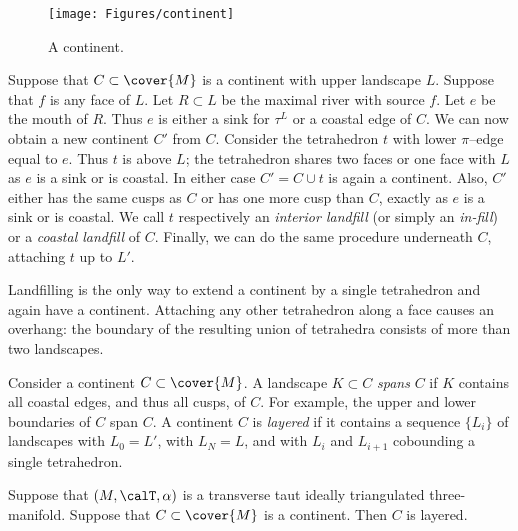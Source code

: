 \documentclass[12pt]{amsart}
\begin{document}
\begin{figure}[htb]
\centering
\texttt{[image: Figures/continent]}
\caption{A continent.}
\label{Fig:Continent}
\end{figure}

Suppose that $C \subset \cover{M}$ is a continent with upper landscape $L$.  Suppose that $f$ is any face of $L$.  Let $R \subset L$ be the maximal river with source $f$.  Let $e$ be the mouth of $R$.  Thus $e$ is either a sink for $\tau^L$ or a coastal edge of $C$.  We can now obtain a new continent $C'$ from $C$.  Consider the tetrahedron $t$ with lower $\pi$--edge equal to $e$.  Thus $t$ is above $L$; the tetrahedron shares two faces or one face with $L$ as $e$ is a sink or is coastal.  In either case $C' = C \cup t$ is again a continent.  Also, $C'$ either has the same cusps as $C$ or has one more cusp than $C$, exactly as $e$ is a sink or is coastal.  We call $t$ respectively an \emph{interior landfill} (or simply an \emph{in-fill}) or a \emph{coastal landfill} of $C$.  Finally, we can do the same procedure underneath $C$, attaching $t$ up to $L'$. 

\begin{remark}
\label{Rem:Fill}
Landfilling is the only way to extend a continent by a single tetrahedron and again have a continent.  Attaching any other tetrahedron along a face causes an overhang: the boundary of the resulting union of tetrahedra consists of more than two landscapes.
\end{remark}

Consider a continent $C \subset \cover{M}$.  A landscape $K \subset C$ \emph{spans} $C$ if $K$ contains all coastal edges, and thus all cusps, of $C$.  
For example, the upper and lower boundaries of $C$ span $C$.  A continent $C$ is \emph{layered} if it contains a sequence $\{L_i\}$ of landscapes with $L_0 = L'$, with $L_N = L$, and with $L_{i}$ and $L_{i+1}$ cobounding a single tetrahedron. 

\begin{lemma}
\label{Lem:ContinentsAreLayered}
Suppose that $(M, \calT, \alpha)$ is a transverse taut ideally triangulated three-manifold.  
Suppose that $C \subset \cover{M}$ is a continent.  Then $C$ is layered.
\end{lemma}
\end{document}
